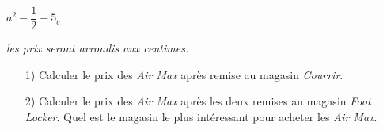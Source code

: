 \documentclass[12pt]{article}
\begin{document}
$a^2 - \dfrac{1}{2} + 5_c $

\textit{les prix seront arrondis aux centimes.}\\

\begin{enumerate}
\item[1)] Calculer le prix des \textit{Air Max} après remise au magasin \textit{Courrir}.
\item[2)] Calculer le prix des \textit{Air Max} après les deux remises au magasin \textit{Foot Locker}. Quel est le magasin le plus intéressant pour acheter les \textit{Air Max}.
\end{enumerate}
\end{document}

